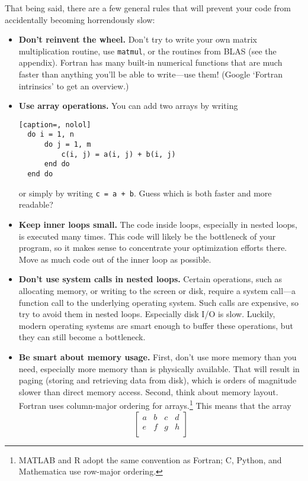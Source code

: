 That being said, there are a few general rules that will prevent your code from accidentally becoming horrendously slow:
\begin{itemize}
  \item\textbf{Don't reinvent the wheel.} Don't try to write your own matrix multiplication routine, use \texttt{matmul}, or the routines from BLAS (see the  appendix).
    Fortran has many built-in numerical functions that are much faster than anything you'll be able to write---use them! (Google `Fortran intrinsics' to get an overview.)
  \item\textbf{Use array operations.} You can add two arrays by writing
\begin{lstlisting}[caption=, nolol]
  do i = 1, n
      do j = 1, m
          c(i, j) = a(i, j) + b(i, j)
      end do
  end do
\end{lstlisting}
or simply by writing \texttt{c = a + b}.
Guess which is both faster and more readable?
  \item\textbf{Keep inner loops small.} The code inside loops, especially in nested loops, is executed many times.
    This code will likely be the bottleneck of your program, so it makes sense to concentrate your optimization efforts there.
    Move as much code out of the inner loop as possible.
  \item\textbf{Don't use system calls in nested loops.} Certain operations, such as allocating memory, or writing to the screen or disk, require a system call---a function call to the underlying operating system.
    Such calls are expensive, so try to avoid them in nested loops.
    Especially disk I/O is slow.
    Luckily, modern operating systems are smart enough to buffer these operations, but they can still become a bottleneck.
  \item\textbf{Be smart about memory usage.} First, don't use more memory than you need, especially more memory than is physically available.
    That will result in paging (storing and retrieving data from disk), which is orders of magnitude slower than direct memory access.
    Second, think about memory layout.
    Fortran uses column-major ordering for arrays.\footnote{MATLAB and R adopt the same convention as Fortran; C, Python, and Mathematica use row-major ordering.}
    This means that the array
    \begin{equation*}
    \begin{bmatrix}
        a & b & c & d \\
        e & f & g & h \\

\end{bmatrix}
\end{equation*}
\end{itemize}
